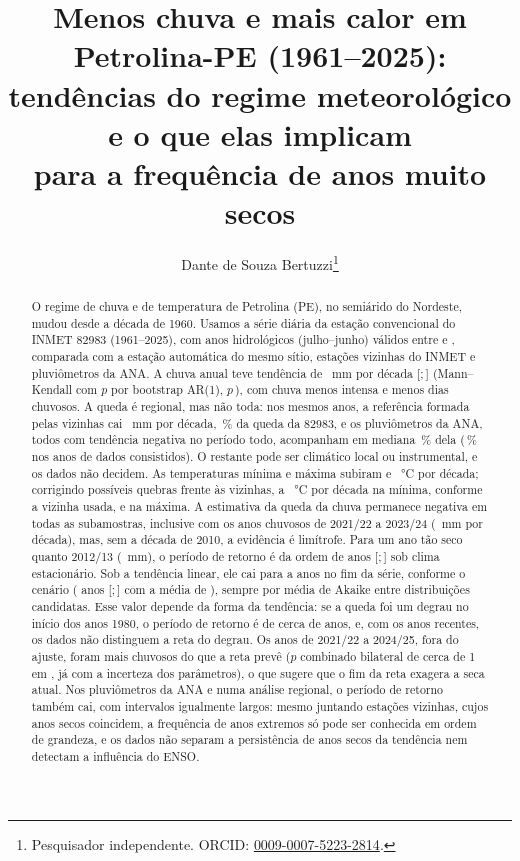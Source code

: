 \documentclass[11pt,a4paper]{article}
\title{Menos chuva e mais calor em Petrolina-PE (1961--2025):\\
       tendências do regime meteorológico e o que elas implicam\\
       para a frequência de anos muito secos}
\author{Dante de Souza Bertuzzi\thanks{Pesquisador independente. ORCID:
        \href{https://orcid.org/0009-0007-5223-2814}{0009-0007-5223-2814}.}}
\date{}
\newcommand{\IC}[2]{[#1;\,#2]}            %
\newcommand{\Est}{82983}
\begin{document}
\maketitle

\begin{abstract}
\noindent
O regime de chuva e de temperatura de Petrolina (PE), no semiárido do Nordeste, mudou desde a
década de 1960. Usamos a série diária da estação convencional do INMET \Est{} (1961--2025), com
\NanosValidos{} anos hidrológicos (julho--junho) válidos entre \PrimeiroAnoValido{} e
\UltimoAnoValido{}, comparada com a estação automática do mesmo sítio, \NvizinhasUsadas{} estações
vizinhas do INMET e \NPostosAna{} pluviômetros da ANA. A chuva anual teve tendência de
\SenChuva{}~mm por década \IC{\SenChuvaICinf}{\SenChuvaICsup} (Mann--Kendall com $p$ por bootstrap
AR(1), $p$\,\PTFPWChuva), com chuva menos intensa e menos dias chuvosos.
A queda é regional, mas não toda: nos mesmos anos, a referência formada pelas vizinhas cai
\SenReferencia{}~mm por década, \PctRefEst{}\,\% da queda da \Est{}, e os pluviômetros da ANA, todos
com tendência negativa no período todo, acompanham em mediana \RazaoSenAnaMediana{}\,\% dela
(\RazaoSenAnaConsMediana{}\,\% nos anos de dados consistidos). O restante pode ser climático local ou
instrumental, e os dados não decidem. As temperaturas mínima e máxima subiram \SenTmin{} e
\SenTmax{}~°C por década; corrigindo possíveis quebras frente às vizinhas, \SenTminAjustada{} a
\SenTminAjustadaCabrobo{}~°C por década na mínima, conforme a vizinha usada, e \SenTmaxAjustada{} na
máxima. A estimativa da queda da chuva permanece negativa em todas as
subamostras, inclusive com os anos chuvosos de 2021/22 a 2023/24 (\SenChuvaRecentes{}~mm por
década), mas, sem a década de 2010, a evidência é limítrofe. Para um ano tão seco quanto 2012/13
(\ChuvaDozeTreze{}~mm), o período de retorno é da ordem de \TMediaAkaikeB{} anos
\IC{\TMediaAkaikeBICinf}{\TMediaAkaikeBICsup} sob clima estacionário. Sob a tendência linear, ele cai
para \TNSFaixaMin{} a \TNSFaixaMax{} anos no fim da série, conforme o cenário (\TNSMediaUlt{} anos
\IC{\TNSMediaUltICinf}{\TNSMediaUltICsup} com a média de \UltimoAnoNS{}), sempre por média de Akaike
entre distribuições candidatas. Esse valor depende da forma da tendência: se a queda foi um degrau
no início dos anos 1980, o período de retorno é de cerca de \TFormaDegrau{} anos, e, com os anos
recentes, os dados não distinguem a reta do degrau. Os anos de 2021/22 a 2024/25, fora do ajuste,
foram mais chuvosos do que a reta prevê ($p$ combinado bilateral de cerca de 1 em
\PRecFisherBilPredInv{}, já com a incerteza dos parâmetros), o que sugere que o fim da reta exagera a
seca atual. Nos pluviômetros da ANA e numa análise regional, o período de retorno também cai, com
intervalos igualmente largos: mesmo juntando estações vizinhas, cujos anos secos coincidem, a
frequência de anos extremos só pode ser conhecida em ordem de grandeza, e os dados não separam a
persistência de anos secos da tendência nem detectam a influência do ENSO.
\end{abstract}
\end{document}
